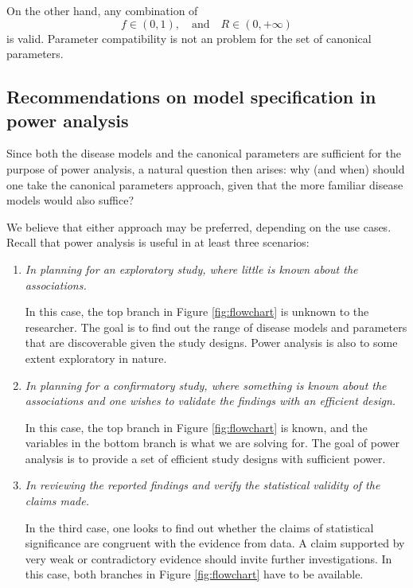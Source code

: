 On the other hand, any combination of 
\begin{equation*}
    f\in(0,1), \quad \text{and} \quad R\in(0,+\infty)
\end{equation*}
is valid. 
Parameter compatibility is not an problem for the set of canonical parameters.

\subsection{Recommendations on model specification in power analysis}

Since both the disease models and the canonical parameters are sufficient for the purpose of power analysis, a natural question then arises: why (and when) should one take the canonical parameters approach, given that the more familiar disease models would also suffice?

We believe that either approach may be preferred, depending on the use cases.
Recall that power analysis is useful in at least three scenarios:
\begin{enumerate}
    \item {\it In planning for an exploratory study, where little is known about the associations.}
    
    In this case, the top branch in Figure \ref{fig:flowchart} is unknown to the researcher.
    The goal is to find out the range of disease models and parameters that are discoverable given the study designs.
    Power analysis is also to some extent exploratory in nature.
    
    \item {\it In planning for a confirmatory study, where something is known about the associations and one wishes to validate the findings with an efficient design.}
    
    In this case, the top branch in Figure \ref{fig:flowchart} is known, and the variables in the bottom branch is what we are solving for.
    The goal of power analysis is to provide a set of efficient study designs with sufficient power.
    
    \item {\it In reviewing the reported findings and verify the statistical validity of the claims made.}
    
    In the third case, one looks to find out whether the claims of statistical significance are congruent with the evidence from data.
    A claim supported by very weak or contradictory evidence should invite further investigations.
    In this case, both branches in Figure \ref{fig:flowchart} have to be available.
\end{enumerate}

